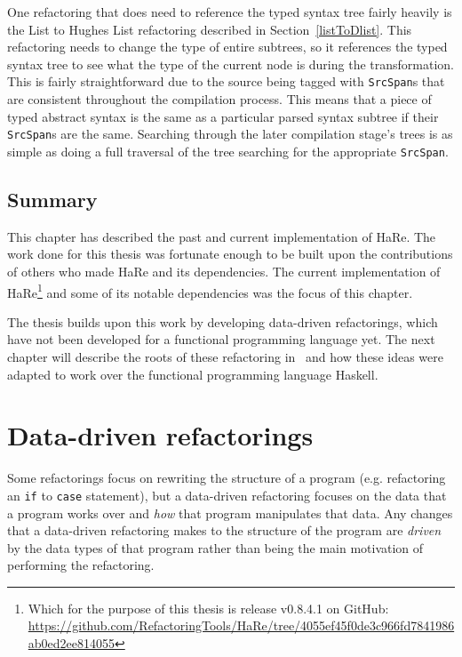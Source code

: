 One refactoring that does need to reference the typed syntax tree fairly heavily is the List to Hughes List refactoring described in Section~\ref{listToDlist}. This refactoring needs to change the type of entire subtrees, so it references the typed syntax tree to see what the type of the current node is during the transformation. This is fairly straightforward due to the source being tagged with \texttt{SrcSpan}s that are consistent throughout the compilation process. This means that a piece of typed abstract syntax is the same as a particular parsed syntax subtree if their \texttt{SrcSpan}s are the same. Searching through the later compilation stage's trees is as simple as doing a full traversal of the tree searching for the appropriate \texttt{SrcSpan}.

\section{Summary}

This chapter has described the past and current implementation of HaRe. The work done for this thesis was fortunate enough to be built upon the contributions of others who made HaRe and its dependencies. The current implementation of HaRe\footnote{Which for the purpose of this thesis is release v0.8.4.1 on GitHub: \url{https://github.com/RefactoringTools/HaRe/tree/4055ef45f0de3c966fd7841986ab0ed2ee814055}} and some of its notable dependencies was the focus of this chapter.

The thesis builds upon this work by developing data-driven refactorings, which have not been developed for a functional programming language yet. The next chapter will describe the roots of these refactoring in~\cite{fowler} and how these ideas were adapted to work over the functional programming language Haskell.
\chapter{Data-driven refactorings}
\label{chp:ddRefs}

Some refactorings focus on rewriting the structure of a program (e.g. refactoring an \texttt{if} to \texttt{case} statement), but a data-driven refactoring focuses on the data that a program works over and \textit{how} that program manipulates that data. Any changes that a data-driven refactoring makes to the structure of the program are \textit{driven} by the data types of that program rather than being the main motivation of performing the refactoring. 

